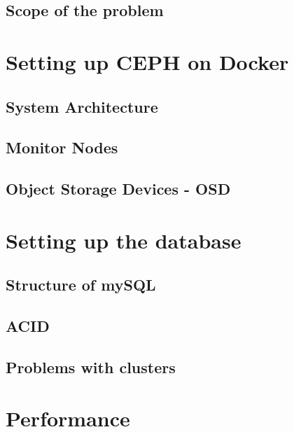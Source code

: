 \documentclass[titlepage, a4paper, 11pt]{scrartcl}
\begin{document}
        \subsection{Scope of the problem}

    \section{Setting up CEPH on Docker}

        \subsection{System Architecture}

        \subsection{Monitor Nodes}

        \subsection{Object Storage Devices - OSD}
        
    \section{Setting up the database}

        \subsection{Structure of mySQL}


        \subsection{ACID}

        \subsection{Problems with clusters}


    \section{Performance}
\end{document}
